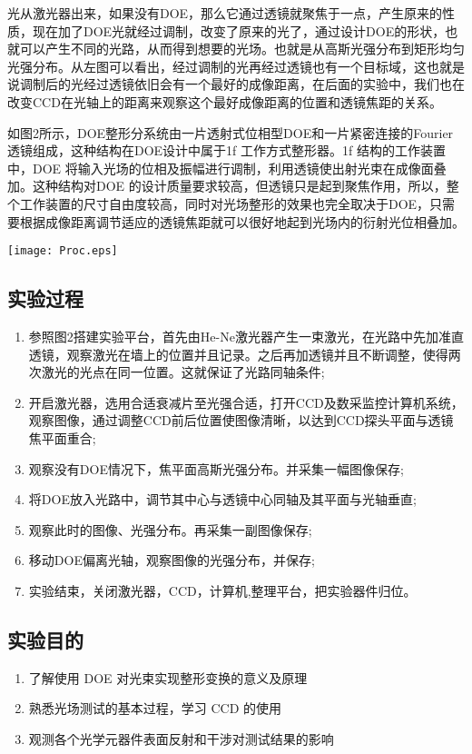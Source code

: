\documentclass[UTF8]{ctexart}
\makeatletter
\newcommand{\figcaption}{\def\@captype{figure}\caption}
\makeatother
\begin{document}
光从激光器出来，如果没有DOE，那么它通过透镜就聚焦于一点，产生原来的性质，现在加了DOE光就经过调制，改变了原来的光了，通过设计DOE的形状，也就可以产生不同的光路，从而得到想要的光场。也就是从高斯光强分布到矩形均匀光强分布。从左图可以看出，经过调制的光再经过透镜也有一个目标域，这也就是说调制后的光经过透镜依旧会有一个最好的成像距离，在后面的实验中，我们也在改变CCD在光轴上的距离来观察这个最好成像距离的位置和透镜焦距的关系。
	
如图2所示，DOE整形分系统由一片透射式位相型DOE和一片紧密连接的Fourier透镜组成，这种结构在DOE设计中属于1f 工作方式整形器。1f 结构的工作装置中，DOE 将输入光场的位相及振幅进行调制，利用透镜使出射光束在成像面叠加。这种结构对DOE
的设计质量要求较高，但透镜只是起到聚焦作用，所以，整个工作装置的尺寸自由度较高，同时对光场整形的效果也完全取决于DOE，只需要根据成像距离调节适应的透镜焦距就可以很好地起到光场内的衍射光位相叠加。
\begin{center}
	\texttt{[image: Proc.eps]}
	\figcaption{DOE整形系统原理示意图}
\end{center}
	\subsection{实验过程}
	\begin{enumerate}
\item 参照图2搭建实验平台，首先由He-Ne激光器产生一束激光，在光路中先加准直透镜，观察激光在墙上的位置并且记录。之后再加透镜并且不断调整，使得两次激光的光点在同一位置。这就保证了光路同轴条件;
\item 开启激光器，选用合适衰减片至光强合适，打开CCD及数采监控计算机系统，观察图像，通过调整CCD前后位置使图像清晰，以达到CCD探头平面与透镜焦平面重合;
\item 观察没有DOE情况下，焦平面高斯光强分布。并采集一幅图像保存;
\item 将DOE放入光路中，调节其中心与透镜中心同轴及其平面与光轴垂直;
\item 观察此时的图像、光强分布。再采集一副图像保存;
\item 移动DOE偏离光轴，观察图像的光强分布，并保存;	
\item 实验结束，关闭激光器，CCD，计算机,整理平台，把实验器件归位。
	\end{enumerate}
	\subsection{实验目的}	
	\begin{enumerate}
	\item 了解使用 DOE 对光束实现整形变换的意义及原理 
	\item 熟悉光场测试的基本过程，学习 CCD 的使用 
	\item 观测各个光学元器件表面反射和干涉对测试结果的影响 
	\end{enumerate}
\end{document}
